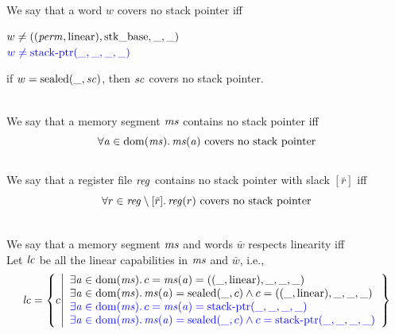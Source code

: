 \documentclass[a4paper]{article}
\begin{document}
\begin{definition}
  \label{def:no-stk-ptr}
~\\
  We say that a word $w$ covers no stack pointer iff\\
  \begin{item}
    \item $w \neq ((\mathit{perm},\mathrm{linear}),\mathrm{stk\_base},\_,\_)$\\
          ${\color{blue} w \neq \mathrm{stack\text{-}ptr}(\_,\_,\_,\_)}$
    \item if $w = \mathrm{sealed}(\_,\mathit{sc})$, then $\mathit{sc}$ covers no stack pointer.
  \end{item}
~\\
  We say that a memory segment $\mathit{ms}$ contains no stack pointer iff
  \[
    \forall \mathit{a} \in \mathrm{dom}(\mathit{ms})\ldotp \text{$\mathit{ms}(\mathit{a})$ covers no stack pointer}
  \]
~\\
  We say that a register file $\mathit{reg}$ contains no stack pointer with slack $[\bar{r}]$ iff
  \[
    \forall r \in \mathit{reg} \setminus [\bar{r}] \ldotp \text{$\mathit{reg}(r)$ covers no stack pointer}
  \]
\end{definition}

\begin{definition}
  \label{def:resp-linearity}
~\\
  We say that a memory segment $\mathit{ms}$ and words $\bar{w}$ respects linearity iff\\
  Let $\mathit{lc}$ be all the linear capabilities in $\mathit{ms}$ and $\bar{w}$, i.e.,
  \[
    \mathit{lc} = \left\{c \middle|
      \begin{array}{l}
        \exists \mathit{a} \in \mathrm{dom}(\mathit{ms}) \ldotp c = \mathit{ms}(\mathit{a}) = ((\_,\mathrm{linear}),\_,\_,\_) \\
        \exists \mathit{a} \in \mathrm{dom}(\mathit{ms}) \ldotp \mathit{ms}(\mathit{a}) = \mathrm{sealed}(\_,c) \land c = ((\_,\mathrm{linear}),\_,\_,\_) \\
        {\color{blue} \exists \mathit{a} \in \mathrm{dom}(\mathit{ms}) \ldotp c = \mathit{ms}(\mathit{a}) = \mathrm{stack\text{-}ptr}(\_,\_,\_,\_)} \\
        {\color{blue} \exists \mathit{a} \in \mathrm{dom}(\mathit{ms}) \ldotp \mathit{ms}(\mathit{a}) = \mathrm{sealed}(\_,c) \land c= \mathrm{stack\text{-}ptr}(\_,\_,\_,\_)} \\
      \end{array}
\right\}
  \]
\end{definition}
\end{document}
